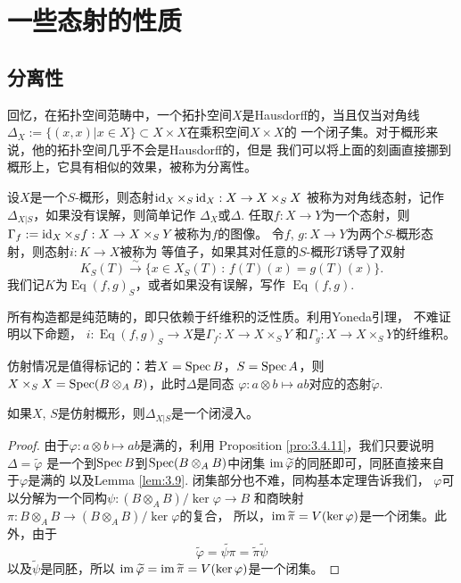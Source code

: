 
\chapter{一些态射的性质}

\section{分离性}

回忆，在拓扑空间范畴中，一个拓扑空间$X$是Hausdorff的，当且仅当对角线
$\Delta_X:=\{(x,x)|x\in X\}\subset X\times X$在乘积空间$X\times X$的
一个闭子集。对于概形来说，他的拓扑空间几乎不会是Hausdorff的，但是
我们可以将上面的刻画直接挪到概形上，它具有相似的效果，被称为分离性。

\begin{para}
	设$X$是一个$S$-概形，则态射$\operatorname{id}_X\times_S\operatorname{id}_X:X\to X\times_S X$
	被称为对角线态射，记作$\Delta_{X|S}$，如果没有误解，则简单记作
	$\Delta_X$或$\Delta$. 任取$f:X\to Y$为一个态射，则
	$\Gamma_f:=\operatorname{id}_X\times_S f:X\to X\times_S Y$被称为$f$的图像。
	令$f$, $g:X\to Y$为两个$S$-概形态射，则态射$i: K\to X$被称为
	等值子，如果其对任意的$S$-概形$T$诱导了双射
	\[
		K_S(T)\xrightarrow{\sim} \{x\in X_S(T)\,:\, f(T)(x)=g(T)(x)\}.
	\]
	我们记$K$为$\operatorname{Eq}(f,g)_S$，或者如果没有误解，写作
	$\operatorname{Eq}(f,g)$.

	所有构造都是纯范畴的，即只依赖于纤维积的泛性质。利用Yoneda引理，
	不难证明以下命题，
	$i:\operatorname{Eq}(f,g)_S\to X$是$\Gamma_f:X\to X\times_S Y$
	和$\Gamma_g:X\to X\times_S Y$的纤维积。
\end{para}

仿射情况是值得标记的：若$X=\operatorname{Spec} B$，$S=\operatorname{Spec} A$，则
$X\times_S X=\operatorname{Spec} (B\otimes_A B)$，此时$\Delta$是同态
$\varphi:a\otimes b\mapsto ab$对应的态射$\widetilde{\varphi}$.

\begin{lem}\label{lem:4.1.2}
	如果$X$, $S$是仿射概形，则$\Delta_{X|S}$是一个闭浸入。
\end{lem}

\begin{proof}
由于$\varphi:a\otimes b\mapsto ab$是满的，利用
Proposition \ref{pro:3.4.11}，我们只要说明$\Delta=\widetilde{\varphi}$
是一个到$\operatorname{Spec} B$到$\operatorname{Spec} (B\otimes_A B)$中闭集
$\operatorname{im} \widetilde{\varphi}$的同胚即可，同胚直接来自于$\varphi$是满的
以及Lemma \ref{lem:3.9}. 闭集部分也不难，同构基本定理告诉我们，
$\varphi$可以分解为一个同构$\psi:(B\otimes_A B)/\ker \varphi\to B$
和商映射$\pi:B\otimes_A B\to (B\otimes_A B)/\ker \varphi$的复合，
所以，$\operatorname{im} \widetilde{\pi}=V(\ker \varphi)$是一个闭集。此外，由于
\[
\widetilde{\varphi}=\widetilde{\psi\pi}=\widetilde{\pi}\widetilde{\psi}
\]
以及$\widetilde{\psi}$是同胚，所以
$\operatorname{im} \widetilde{\varphi}=\operatorname{im} \widetilde{\pi}=V(\ker \varphi)$是一个闭集。
\end{proof}

